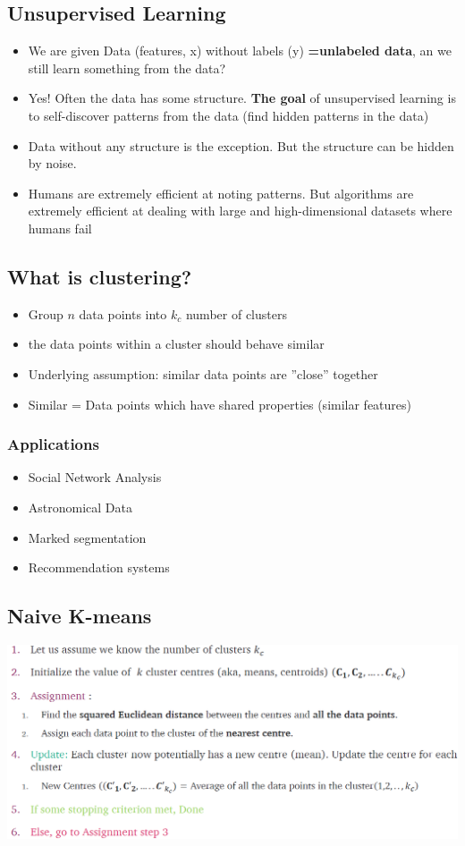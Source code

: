 \subsection{Unsupervised Learning}
\begin{itemize}
    \item We are given Data (features, x) without labels (y) \textbf{=unlabeled data}, an we still learn something from the data?
    \item Yes! Often the data has some structure. \textbf{The goal} of unsupervised learning is to self-discover patterns from the data (find hidden patterns in the data)
    \item Data without any structure is the exception. But the structure can be hidden by noise.
    \item Humans are extremely efficient at noting patterns. But algorithms are extremely efficient at dealing with large and high-dimensional datasets where humans fail
\end{itemize}

\subsection{What is clustering?}
\begin{itemize}
    \item Group $n$ data points into $k_c$ number of clusters
    \item the data points within a cluster should behave similar
    \item Underlying assumption: similar data points are ''close'' together
    \item Similar = Data points which have shared properties (similar features)
\end{itemize}

\subsubsection{Applications}
\begin{itemize}
    \item Social Network Analysis
    \item Astronomical Data
    \item Marked segmentation
    \item Recommendation systems
\end{itemize}

\subsection{Naive K-means}
\includegraphics[width=\linewidth]{./img/k-means.png}
